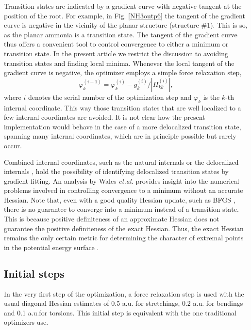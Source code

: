 \documentclass[prl,twocolumn,showpacs,twocolumngrid,superbib]{revtex4}
\begin{document}
Transition states are indicated by a gradient curve with  negative tangent at the position
of the root.  For example, in Fig. \ref{NH3outp6} the tangent of the gradient curve is negative 
in the vicinity of the planar structure (structure \#1). This is so, as the planar ammonia 
is a transition state. The tangent of the gradient curve thus offers a convenient tool 
to control convergence to either a minimum or transition state.  In the present article we 
restrict the discussion to avoiding transition states and finding local minima. 
Whenever the local tangent of the gradient curve is negative, the optimizer employs a simple force relaxation step,
\begin{equation}
\label{tseq}
\varphi_{k}^{(i+1)} = \varphi_{k}^{(i)} -g_{k}^{(i)}/|H_{kk}^{(i)}| ,
\end{equation}
where $i$ denotes the serial number of the optimization step and $\varphi_{k}$ is the $k$-th internal coordinate.
This way those transition states that are well localized to a few internal coordinates
are avoided.  It is not clear how the present implementation would behave in the 
case of a more delocalized transition state, spanning many internal coordinates, which 
are in principle possible but rarely occur.  

Combined internal coordinates, such as the natural internals \cite{Pulay_natural_internals} or the
delocalized internals \cite{Baker_deloc_1}, hold the possibility of identifying delocalized transition 
states by gradient fitting.  An analysis by  Wales {\it et.al.} \cite{Wales_saddlepoint} provides 
insight into the numerical problems involved in controlling convergence to a minimum without an 
accurate Hessian.  Note that, even with a good quality Hessian update, such as BFGS \cite{RFletcher},
there is no guarantee to converge into a minimum instead of a transition state. 
This is because positive definiteness of an approximate Hessian does not guarantee
the positive definiteness of the exact Hessian.  Thus, the exact Hessian remains the only 
certain metric for determining the character of extremal points in the potential energy 
surface \cite{Pulay_natural_internals}.

\subsection{Initial steps}

In the very first step of the optimization, a force relaxation step is used with the usual 
diagonal Hessian estimates of 0.5 a.u. for stretchings, 0.2 a.u. for bendings and 0.1 a.u.for 
torsions.  This initial step is equivalent with the one traditional optimizers use.
\end{document}
